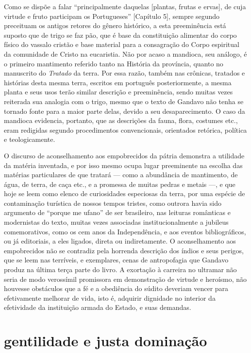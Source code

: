 Como se dispõe a falar ``principalmente daquelas [plantas,
frutas e ervas], de cuja virtude e fruto participam os
Portugueses'' [Capítulo 5], sempre segundo preceituam os
antigos retores do gênero histórico, a esta preeminência está suposto
que de trigo se faz pão, que é base da constituição alimentar do corpo
físico do vassalo cristão e base material para a consagração do Corpo
espiritual da comunidade de Cristo na eucaristia. Não por acaso a
mandioca, seu análogo, é o primeiro mantimento referido tanto na
História da província, quanto no manuscrito do \textit{Tratado} da terra. Por
essa razão, também nas crônicas, tratados e histórias desta mesma
terra, escritos em português posteriormente, a mesma planta e seus usos
terão similar descrição e preeminência, sendo muitas vezes reiterada
sua analogia com o trigo, mesmo que o texto de Gandavo não tenha se
tornado fonte para a maior parte delas, devido a seu desaparecimento. O
caso da mandioca evidencia, portanto, que as descrições da fauna,
flora, costumes etc., eram redigidas segundo procedimentos
convencionais, orientados retórica, política e teologicamente.

O discurso de aconselhamento aos empobrecidos da pátria demonstra a
utilidade da matéria inventada, e por isso mesmo ocupa lugar
preeminente na escolha das matérias particulares de que tratará --- como
a abundância de mantimento, de água, de terra, de caça etc., e a
promessa de muitas pedras e metais ---, e que hoje se leem como elenco de
curiosidades especiosas da terra, por uma espécie de contaminação
turística de nossos tempos tristes, como outrora havia sido argumento
de ``porque me ufano'' de ser brasileiro, nas leituras românticas e
modernistas do texto, muitas vezes associadas institucionalmente a
jubileus comemorativos, como os cem anos da Independência, e aos
eventos bibliográficos, ou já editoriais, a eles ligados, direta ou
indiretamente. O aconselhamento aos empobrecidos não se contradiz pela
horrenda descrição dos índios e seus perigos, que se leem nas
terríveis, e exemplares, cenas de antropofagia que Gandavo produz na
última terça parte do livro. A exortação à carreira no ultramar não
seria de modo verossímil promissora em demonstração de virtude e heroísmo,
não houvesse obstáculos que a fé e a obediência do súdito deveriam
vencer para efetivamente melhorar de vida, isto é, adquirir dignidade
no interior da efetividade da instituição armada do Estado, e suas
demandas.

\section{gentilidade e justa dominação}

